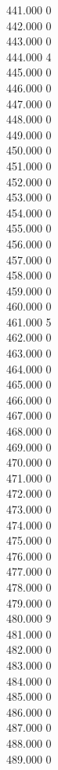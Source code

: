 { 441.000	0 \\
 442.000	0 \\
 443.000	0 \\
 444.000	4 \\
 445.000	0 \\
 446.000	0 \\
 447.000	0 \\
 448.000	0 \\
 449.000	0 \\
 450.000	0 \\
 451.000	0 \\
 452.000	0 \\
 453.000	0 \\
 454.000	0 \\
 455.000	0 \\
 456.000	0 \\
 457.000	0 \\
 458.000	0 \\
 459.000	0 \\
 460.000	0 \\
 461.000	5 \\
 462.000	0 \\
 463.000	0 \\
 464.000	0 \\
 465.000	0 \\
 466.000	0 \\
 467.000	0 \\
 468.000	0 \\
 469.000	0 \\
 470.000	0 \\
 471.000	0 \\
 472.000	0 \\
 473.000	0 \\
 474.000	0 \\
 475.000	0 \\
 476.000	0 \\
 477.000	0 \\
 478.000	0 \\
 479.000	0 \\
 480.000	9 \\
 481.000	0 \\
 482.000	0 \\
 483.000	0 \\
 484.000	0 \\
 485.000	0 \\
 486.000	0 \\
 487.000	0 \\
 488.000	0 \\
 489.000	0 \\
}

